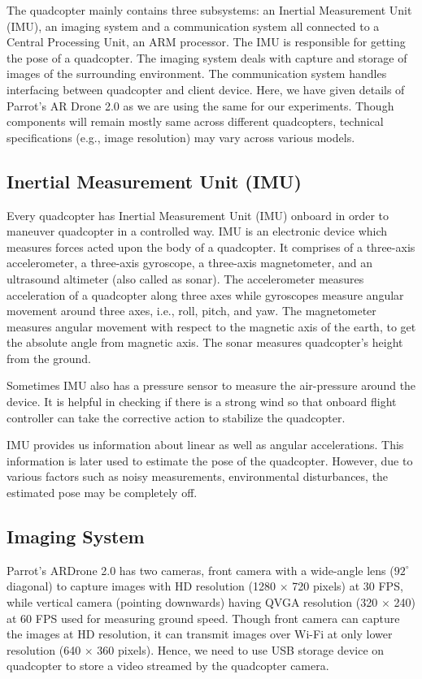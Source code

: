 The quadcopter mainly contains three subsystems: an Inertial Measurement Unit (IMU),
an imaging system and a communication system all connected to a Central Processing
Unit, an ARM processor. The IMU is responsible for getting the pose of a quadcopter.
The imaging system deals with capture and storage of images of the surrounding
environment. The communication system handles interfacing between quadcopter and
client device. Here, we have given details of Parrot's AR Drone 2.0 as we are
using the same for our experiments. Though components will remain mostly same across
different quadcopters, technical specifications (e.g., image resolution) may
vary across various models.

\subsection{Inertial Measurement Unit (IMU)}
Every quadcopter has Inertial Measurement Unit (IMU) onboard in order to maneuver
quadcopter in a controlled way. IMU is an electronic device which measures forces
acted upon the body of a quadcopter. It comprises of a three-axis accelerometer, a three-axis
gyroscope, a three-axis magnetometer, and an ultrasound altimeter (also called as sonar).
The accelerometer measures acceleration of a quadcopter along three axes while gyroscopes
measure angular movement around three axes, i.e., roll, pitch, and yaw. The magnetometer
measures angular movement with respect to the magnetic axis of the earth, to get
the absolute angle from magnetic axis. The sonar measures quadcopter's
height from the ground.

Sometimes IMU also has a pressure sensor to measure the air-pressure around the
device. It is helpful in checking if there is a strong wind so that
onboard flight controller can take the corrective action to stabilize the
quadcopter. 

IMU provides us information about linear as well as angular accelerations. This
information is later used to estimate the pose of the quadcopter. However, due
to various factors such as noisy measurements, environmental disturbances, the
estimated pose may be completely off.
 
\subsection{Imaging System}
Parrot's ARDrone 2.0 has two cameras, front camera with a wide-angle lens
($92^{\circ}$ diagonal) to capture images with HD resolution (1280 $\times$ 720
pixels) at 30 FPS, while vertical camera (pointing downwards) having QVGA
resolution (320 $\times$ 240) at 60 FPS used for measuring ground speed.
Though front camera can capture the images at HD resolution, it can transmit
images over Wi-Fi at only  lower resolution (640 $\times$ 360 pixels). Hence, we
need to use USB storage device on quadcopter to store a video streamed by the
quadcopter camera. 

